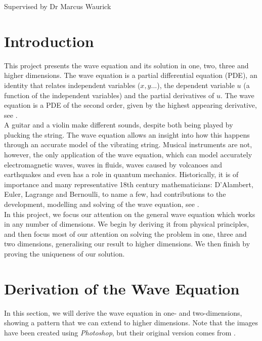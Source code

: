 \documentclass[a4paper, 12pt]{article}
\numberwithin{equation}{section}
\begin{document}
    \vspace*{5cm}
    Supervised by Dr Marcus Waurick
    \newpage
    \normalsize
    \tableofcontents
    \newpage

\section{Introduction}
This project presents the wave equation and its solution in one, two, three and
higher dimensions. The wave equation is a partial differential equation (PDE),
an identity that relates independent variables ($x, y...$), the dependent
variable $u$ (a function of the independent variables) and the partial
derivatives of $u$. The wave equation is a PDE of the second order, given by the
highest appearing derivative, see \cite{Fol}. \\

A guitar and a violin make different sounds, despite both being played by
plucking the string. The wave equation allows an insight into how this happens
through an accurate model of the vibrating string. Musical instruments are not,
however, the  only application of the wave equation, which can model accurately
electromagnetic waves, waves in fluids, waves caused by volcanoes and
earthquakes and even has a role in quantum mechanics. Historically, it is of
importance and many representative 18th century mathematicians: D'Alambert,
Euler, Lagrange and Bernoulli, to name a few, had contributions to the
development, modelling and solving of the wave equation, see \cite{Coc}. \\

In this project, we focus our attention on the general wave equation which works
in any number of dimensions. We begin by deriving it from physical principles,
and then focus most of our attention on solving the problem in one, three and
two dimensions, generalising our result to higher dimensions. We then finish by
proving the uniqueness of our solution.

\section{Derivation of the Wave Equation}
In this section, we will derive the wave equation in one- and two-dimensions,
showing a pattern that we can extend to higher dimensions. Note that the images
have been created using \emph{Photoshop}, but their original version comes from
\cite{Kr}.
\end{document}
